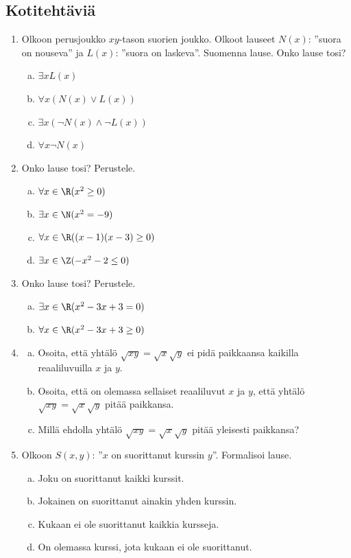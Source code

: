 \subsection*{Kotitehtäviä}

\begin{enumerate}

\item Olkoon perusjoukko $xy$-tason suorien joukko. Olkoot
lauseet $N(x)$: ''suora on nouseva'' ja $L(x)$: ''suora on laskeva''.
Suomenna lause. Onko lause tosi?
\begin{enumerate}[a)]
\item $\exists x L(x)$
\item $\forall x (N(x) \lor L(x))$
\item $\exists x (\lnot N(x) \land \lnot L(x))$
\item $\forall x \lnot N(x)$
\end{enumerate}

\item Onko lause tosi? Perustele.
\begin{enumerate}[a)]
\item $\forall x\in\R (x^2 \ge 0)$
\item $\exists x\in\N (x^2 = -9)$
\item $\forall x\in\R ((x-1)(x-3) \ge 0)$
\item $\exists x\in\Z (-x^2 - 2 \le 0)$
\end{enumerate}

\item Onko lause tosi? Perustele.
\begin{enumerate}[a)]
\item $\exists x\in \R (x^2 - 3x + 3 = 0)$
\item $\forall x\in \R (x^2 - 3x + 3 \ge 0)$
\end{enumerate}

\item
\begin{enumerate}[a)]
\item Osoita, että yhtälö $\sqrt{xy} = \sqrt{x}\sqrt{y}$ ei
pidä paikkaansa kaikilla reaaliluvuilla $x$ ja $y$.
\item Osoita, että on olemassa sellaiset reaaliluvut $x$ ja
$y$, että yhtälö $\sqrt{xy} = \sqrt{x}\sqrt{y}$ pitää paikkansa.
\item Millä ehdolla yhtälö $\sqrt{xy} = \sqrt{x}\sqrt{y}$
pitää yleisesti paikkansa?
\end{enumerate}

\item Olkoon $S(x, y)$: ''$x$ on suorittanut kurssin $y$''.
Formalisoi lause.
\begin{enumerate}[a)]
\item Joku on suorittanut kaikki kurssit.
\item Jokainen on suorittanut ainakin yhden kurssin.
\item Kukaan ei ole suorittanut kaikkia kursseja.
\item On olemassa kurssi, jota kukaan ei ole suorittanut.
\end{enumerate}


\end{enumerate}
